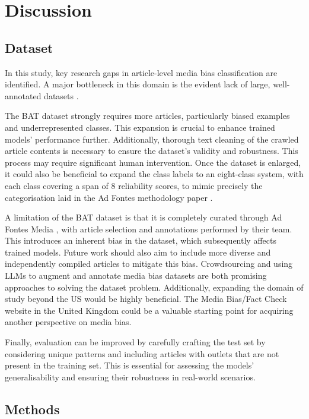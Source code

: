 \section{Discussion}

\subsection{Dataset}

In this study, key research gaps in article-level media bias classification are identified. A major bottleneck in this domain is the evident lack of large, well-annotated datasets \cite{rodrigo-2024-systematic-review-media-bias}.

The BAT dataset strongly requires more articles, particularly biased examples and underrepresented classes. This expansion is crucial to enhance trained models' performance further. Additionally, thorough text cleaning of the crawled article contents is necessary to ensure the dataset's validity and robustness. This process may require significant human intervention. Once the dataset is enlarged, it could also be beneficial to expand the class labels to an eight-class system, with each class covering a span of 8 reliability scores, to mimic precisely the categorisation laid in the Ad Fontes methodology paper \cite{otero-2021-adfontes-methodology}.

A limitation of the BAT dataset is that it is completely curated through Ad Fontes Media \cite{adfontes}, with article selection and annotations performed by their team. This introduces an inherent bias in the dataset, which subsequently affects trained models.  Future work should also aim to include more diverse and independently compiled articles to mitigate this bias. Crowdsourcing \cite{spinde-newsunravel} and using LLMs to augment and annotate media bias datasets \cite{horych-2024-promises} are both promising approaches to solving the dataset problem. Additionally, expanding the domain of study beyond the US would be highly beneficial. The Media Bias/Fact Check website \cite{mbfc} in the United Kingdom could be a valuable starting point for acquiring another perspective on media bias.

Finally, evaluation can be improved by carefully crafting the test set by considering unique patterns and including articles with outlets that are not present in the training set. This is essential for assessing the models' generalisability and ensuring their robustness in real-world scenarios.

\subsection{Methods}

